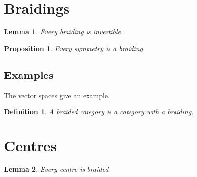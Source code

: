 \documentclass{tac}
\newtheorem{lemma}{Lemma}[section]
\newtheorem{proposition}{Proposition}[section]
\newtheorem{definition}{Definition}[section]
\begin{document}
\section{Braidings}
\begin{lemma} Every braiding is invertible. \end{lemma}
\begin{proposition} Every symmetry is a braiding. \end{proposition}
\subsection{Examples}
The vector spaces give an example.
\begin{definition} A braided category is a category with a braiding. \end{definition}
\section{Centres}
\begin{lemma} Every centre is braided. \end{lemma}
\end{document}
